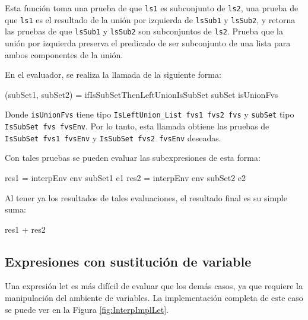 Esta función toma una prueba de que \texttt{ls1} es subconjunto de \texttt{ls2}, una prueba de que \texttt{ls1} es el resultado de la unión por izquierda de \texttt{lsSub1} y \texttt{lsSub2}, y retorna las pruebas de que \texttt{lsSub1} y \texttt{lsSub2} son subconjuntos de \texttt{ls2}. Prueba que la unión por izquierda preserva el predicado de ser subconjunto de una lista para ambos componentes de la unión.

En el evaluador, se realiza la llamada de la siguiente forma:

\begin{code}
(subSet1, subSet2) =
  ifIsSubSetThenLeftUnionIsSubSet subSet isUnionFvs
\end{code}

Donde \texttt{isUnionFvs} tiene tipo \texttt{IsLeftUnion\_List fvs1 fvs2 fvs} y \texttt{subSet} tipo \texttt{IsSubSet fvs fvsEnv}. Por lo tanto, esta llamada obtiene las pruebas de \texttt{IsSubSet fvs1 fvsEnv} y \texttt{IsSubSet fvs2 fvsEnv} deseadas.

Con tales pruebas se pueden evaluar las subexpresiones de esta forma:

\begin{code}
res1 = interpEnv env subSet1 e1
res2 = interpEnv env subSet2 e2
\end{code}

Al tener ya los resultados de tales evaluaciones, el resultado final es su simple suma:

\begin{code}
res1 + res2
\end{code}

\subsection{Expresiones con sustitución de variable}

Una expresión let es más difícil de evaluar que los demás casos, ya que requiere la manipulación del ambiente de variables. La implementación completa de este caso se puede ver en la Figura \ref{fig:InterpImplLet}.

